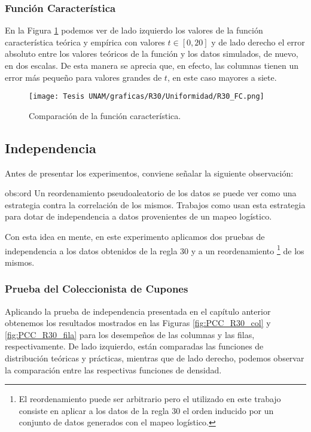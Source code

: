 \documentclass[../Main.tex]{subfiles}
\begin{document}
\subsubsection{Función Característica}
En la Figura \ref{fig:FC_R30} podemos ver de lado izquierdo los valores de la función característica teórica y empírica con valores $t \in [0,20] $ y de lado derecho el error absoluto entre los valores teóricos de la función y los datos simulados, de nuevo, en dos escalas. De esta manera se aprecia que, en efecto, las columnas tienen un error más pequeño para valores grandes de $t$, en este caso mayores a siete.

\begin{figure}[h!]
\hfill
\subfigure
{\texttt{[image: Tesis UNAM/graficas/R30/Uniformidad/R30\_FC.png]}}
\hfill
{}
\hfill
\caption{Comparación de la función característica.}
\label{fig:FC_R30}
\end{figure}

\subsection{Independencia}

Antes de presentar los experimentos, conviene señalar la siguiente observación:
 \begin{remark}{}{obs:ord}
    Un reordenamiento pseudoaleatorio de los datos se puede ver como una estrategia contra la correlación de los mismos. Trabajos como \cite{Phatak1993} usan esta estrategia para dotar de independencia a datos provenientes de un mapeo logístico.
\end{remark}
Con esta idea en mente, en este experimento aplicamos dos pruebas de independencia a los datos obtenidos de la regla 30 y a un reordenamiento \footnote{El reordenamiento puede ser arbitrario pero el utilizado en este trabajo consiste en aplicar a los datos de la regla 30 el orden inducido por un conjunto de datos generados con el mapeo logístico.} de los mismos.

\subsubsection{Prueba del Coleccionista de Cupones}
Aplicando la prueba de independencia presentada en el capítulo anterior obtenemos los resultados mostrados en las Figuras \ref{fig:PCC_R30_col} y \ref{fig:PCC_R30_fila} para los desempeños de las columnas y las filas, respectivamente. De lado izquierdo, están comparadas las funciones de distribución teóricas y prácticas, mientras que de lado derecho, podemos observar la comparación entre las respectivas funciones de densidad.
\end{document}
